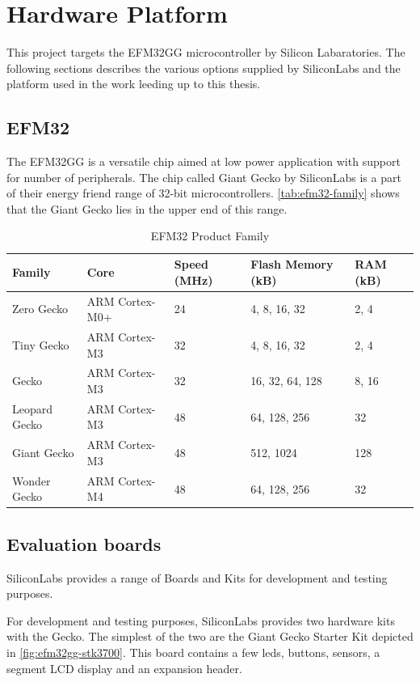 \section{Hardware Platform}
\label{sec:back:hw}

This project targets the EFM32GG microcontroller by Silicon Labaratories.
The following sections describes the various options supplied by SiliconLabs and the platform used in the work leeding up to this thesis.

\subsection{EFM32}
The EFM32GG is a versatile chip aimed at low power application with support for number of peripherals.
The chip called Giant Gecko by SiliconLabs is a part of their energy friend range of 32-bit microcontrollers.
\autoref{tab:efm32-family} shows that the Giant Gecko lies in the upper end of this range.

\begin{table}[H]
  \centering
  \begin{tabular}{|l|l|l|l|l|}
    \hline
    Family & Core & Speed (MHz) & Flash Memory (kB) & RAM (kB) \\
    \hline
    Zero Gecko & ARM Cortex-M0+ & 24 & 4, 8, 16, 32 & 2, 4 \\
    Tiny Gecko & ARM Cortex-M3 & 32 & 4, 8, 16, 32 & 2, 4 \\
    Gecko & ARM Cortex-M3 & 32 & 16, 32, 64, 128 & 8, 16 \\
    Leopard Gecko & ARM Cortex-M3 & 48 & 64, 128, 256 & 32 \\
    Giant Gecko & ARM Cortex-M3 & 48 & 512, 1024 & 128 \\
    Wonder Gecko & ARM Cortex-M4 & 48 & 64, 128, 256 & 32 \\
    \hline
  \end{tabular}
  \caption{EFM32 Product Family \cite{web:silabs}}
  \label{tab:efm32-family}
\end{table}

\subsection{Evaluation boards}

SiliconLabs provides a range of Boards and Kits for development and testing purposes.

For development and testing purposes, SiliconLabs provides two hardware kits with the Gecko.
The simplest of the two are the Giant Gecko Starter Kit depicted in \autoref{fig:efm32gg-stk3700}.
This board contains a few leds, buttons, sensors, a segment LCD display and an expansion header.

